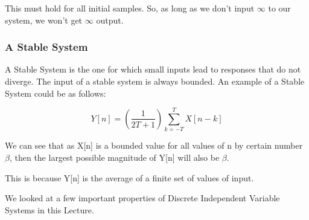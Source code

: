 This must hold for all initial samples. So, as long as we don't input $\infty$ to our system, we won't get $\infty$ output.


\subsubsection{A Stable System}

A Stable System is the one for which small inputs lead to responses that do not diverge. 
The input of a stable system is always bounded.
An example of a Stable System could be as follows:

$$Y[n]=(\frac{1}{2T+1})\sum_{k=-T}^{T} X[n-k]$$

We can see that as X[n] is a bounded value for all values of n by certain number $\beta$, then the largest possible magnitude of Y[n] will also be $\beta$.

This is because Y[n] is the average of a finite set of values of input. 

We looked at a few important properties of Discrete Independent Variable Systems in this Lecture. 